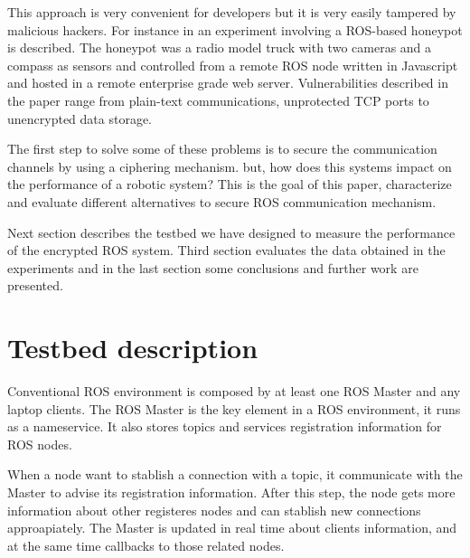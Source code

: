 \documentclass[journal,twoside]{JoPhA}
\begin{document}
This approach is very convenient for developers but it is very easily tampered by malicious hackers. For instance in \cite{McClean2013} an experiment involving a ROS-based honeypot is described. The honeypot was a radio model truck with two cameras and a compass as sensors and controlled from a remote ROS node written in Javascript and hosted in a remote enterprise grade web server. Vulnerabilities described in the paper range from plain-text communications, unprotected TCP ports to unencrypted data storage.

The first step to solve some of these problems is to secure the communication channels by using a ciphering mechanism. but, how does this systems impact on the performance of a robotic system? This is the goal of this paper, characterize and evaluate different alternatives to secure ROS communication mechanism.

Next section describes the testbed we have designed to measure the performance of the encrypted ROS system. Third section evaluates the data obtained in the experiments and in the last section some conclusions and further work are presented.



\section{Testbed description}

Conventional ROS environment is composed by at least one ROS Master and any laptop clients. The ROS Master is the key element in a ROS environment, it runs as a nameservice.
It also stores topics and services registration information for ROS nodes. 

When a node want to stablish a connection with a topic, it communicate with the Master to advise its registration information. After this step, the node gets more information about other registeres nodes and can stablish new connections approapiately. The Master is updated in real time about clients information, and at the same time callbacks to those related nodes.



\end{document}
